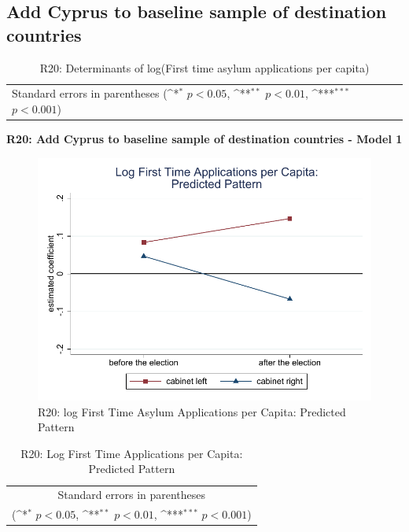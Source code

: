 \documentclass[10pt,a4paper]{scrartcl}
\begin{document}


\clearpage
\FloatBarrier
\subsection{Add Cyprus to baseline sample of destination countries}
\begin{table}[!ht]\centering
	\renewcommand{\arraystretch}{1.25}
	\small
	\def\sym#1{\ifmmode^{#1}\else\(^{#1}\)\fi}
	\caption{R20: Determinants of log(First time asylum applications per capita)}
	\begin{tabular}{l*{3}{c}}
		\hline\hline
		
		\hline\hline
		\multicolumn{4}{l}{\footnotesize Standard errors in parentheses (\sym{*} \(p<0.05\), \sym{**} \(p<0.01\), \sym{***} \(p<0.001\))}\\
	\end{tabular}
\end{table}

\clearpage
\textbf{R20: Add Cyprus to baseline sample of destination countries - Model 1}
\begin{figure}[!ht]
	\centering
	\includegraphics[width=1\textwidth]{figures_edited/app_graph1_R20.pdf}
	\caption{R20: log First Time Asylum Applications per Capita: Predicted Pattern}
\end{figure}

\begin{table}[!ht]\centering
	\renewcommand{\arraystretch}{1.25}
	\def\sym#1{\ifmmode^{#1}\else\(^{#1}\)\fi}
	\caption{R20: Log First Time Applications per Capita: Predicted Pattern}
	\begin{tabular}{l*{2}{c}}
		\hline\hline
		
		\hline\hline
		\multicolumn{3}{c}{\footnotesize Standard errors in parentheses} \\
		\multicolumn{3}{c}{\footnotesize (\sym{*} \(p<0.05\), \sym{**} \(p<0.01\), \sym{***} \(p<0.001\))}\\
	\end{tabular}
\end{table}
\end{document}
